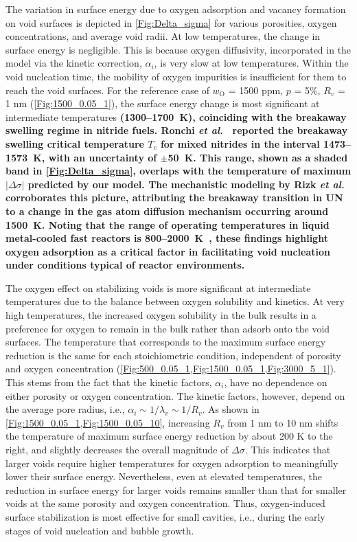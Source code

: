 \documentclass[preprint,12pt,sort&compress]{elsarticle}
\newcommand{\?}{\stackrel{?}{=}}
\providecommand{\DIFaddtex}[1]{{\bf #1}} %
\providecommand{\DIFdeltex}[1]{} %
\providecommand{\DIFaddbegin}{\protect\color{blue}} %
\providecommand{\DIFaddend}{\protect\color{black}} %
\providecommand{\DIFdelbegin}{\protect\color{red}} %
\providecommand{\DIFdelend}{\protect\color{black}} %
\providecommand{\DIFadd}[1]{\texorpdfstring{\DIFaddtex{#1}}{#1}} %
\providecommand{\DIFdel}[1]{\texorpdfstring{\DIFdeltex{#1}}{}} %
\newcommand{\DIFscaledelfig}{0.5}
\newlength{\DIFdelgraphicswidth} %
\newlength{\DIFdelgraphicsheight} %
\newcommand{\DIFaddincludegraphics}[2][]{{\color{blue}\fbox{\DIFOincludegraphics[#1]{#2}}}} %
\newcommand{\DIFdelincludegraphics}[2][]{%
\sbox{\DIFdelgraphicsbox}{\DIFOincludegraphics[#1]{#2}}%
\settoboxwidth{\DIFdelgraphicswidth}{\DIFdelgraphicsbox} %
\settoboxtotalheight{\DIFdelgraphicsheight}{\DIFdelgraphicsbox} %
\scalebox{\DIFscaledelfig}{%
\parbox[b]{\DIFdelgraphicswidth}{\usebox{\DIFdelgraphicsbox}\\[-\baselineskip] \rule{\DIFdelgraphicswidth}{0em}}\llap{\resizebox{\DIFdelgraphicswidth}{\DIFdelgraphicsheight}{%
\setlength{\unitlength}{\DIFdelgraphicswidth}%
\begin{picture}(1,1)%
\thicklines\linethickness{2pt} %
{\color[rgb]{1,0,0}\put(0,0){\framebox(1,1){}}}%
{\color[rgb]{1,0,0}\put(0,0){\line( 1,1){1}}}%
{\color[rgb]{1,0,0}\put(0,1){\line(1,-1){1}}}%
\end{picture}%
}\hspace*{3pt}}} %
} %
\DeclareRobustCommand{\DIFaddbegin}{\DIFOaddbegin \let\includegraphics\DIFaddincludegraphics} %
\DeclareRobustCommand{\DIFaddend}{\DIFOaddend \let\includegraphics\DIFOincludegraphics} %
\DeclareRobustCommand{\DIFdelbegin}{\DIFOdelbegin \let\includegraphics\DIFdelincludegraphics} %
\DeclareRobustCommand{\DIFdelend}{\DIFOaddend \let\includegraphics\DIFOincludegraphics} %
\begin{document}
\DIFdelend The variation in surface energy due to oxygen adsorption and vacancy formation on void surfaces is depicted in \cref{Fig:Delta_sigma} for various porosities, oxygen concentrations, and average void radii. At low temperatures, the change in surface energy is negligible. This is because oxygen diffusivity, incorporated in the model via the kinetic correction, $\alpha_i$, is very slow at low temperatures. Within the void nucleation time, the mobility of oxygen impurities is insufficient for them to reach the void surfaces. For the reference case of $w_\text{O}$ = 1500 ppm, $p$ = 5\%, $R_v$ = 1 nm (\cref{Fig:1500_0.05_1}), the surface energy change is most significant at intermediate temperatures \DIFdelbegin \DIFdel{, around 1500 K, where breakaway swelling in UN is predicted to start \cite{Rizk2025} .
}\DIFdelend \DIFaddbegin \DIFadd{(1300--1700~K), coinciding with the breakaway swelling regime in nitride fuels. Ronchi \textit{et al.}~\cite{Ronchi1978} reported the breakaway swelling critical temperature $T_c$ for mixed nitrides in the interval 1473--1573~K, with an uncertainty of $\pm$50~K. This range, shown as a shaded band in \cref{Fig:Delta_sigma}, overlaps with the temperature of maximum $|\Delta \sigma|$ predicted by our model. The mechanistic modeling by Rizk \textit{et al.}~\cite{Rizk2025} corroborates this picture, attributing the breakaway transition in UN to a change in the gas atom diffusion mechanism occurring around 1500~K. Noting that the range of operating temperatures in liquid metal-cooled fast reactors is 800--2000~K~\cite{Turos1990}, these findings highlight oxygen adsorption as a critical factor in facilitating void nucleation under conditions typical of reactor environments.
}\DIFaddend 

The oxygen effect on stabilizing voids is more significant at intermediate temperatures due to the balance between oxygen solubility and kinetics. At very high temperatures, the increased oxygen solubility in the bulk results in a preference for oxygen to remain in the bulk rather than adsorb onto the void surfaces. The temperature that corresponds to the maximum surface energy reduction is the same for each stoichiometric condition, independent of porosity and oxygen concentration (\cref{Fig:500_0.05_1,Fig:1500_0.05_1,Fig:3000_5_1}). This stems from the fact that the kinetic factors, $\alpha_i$, have no dependence on either porosity or oxygen concentration. The kinetic factors, however, depend on the average pore radius, i.e., $\alpha_i \sim 1/\lambda_v \sim 1/R_v$. As shown in \cref{Fig:1500_0.05_1,Fig:1500_0.05_10}, increasing $R_v$ from 1 nm to 10 nm shifts the temperature of maximum surface energy reduction by about 200 K to the right, and slightly decreases the overall magnitude of $\Delta \sigma$. This indicates that larger voids require higher temperatures for oxygen adsorption to meaningfully lower their surface energy. Nevertheless, even at elevated temperatures, the reduction in surface energy for larger voids remains smaller than that for smaller voids at the same porosity and oxygen concentration. Thus, oxygen-induced surface stabilization is most effective for small cavities, i.e., during the early stages of void nucleation and bubble growth.
\end{document}

